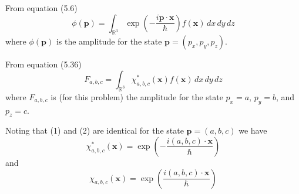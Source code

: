 


From equation (5.6)
\begin{equation*}
\phi(\mathbf p)=\int_{\mathbb R^3}\exp\left(-\frac{i\mathbf p\cdot\mathbf x}{\hbar}\right)f(\mathbf x)\,dx\,dy\,dz
\tag{1}
\end{equation*}
where $\phi(\mathbf p)$ is the amplitude for the state $\mathbf p=(p_x,p_y,p_z)$.

\bigskip
From equation (5.36)
\begin{equation*}
F_{a,b,c}=\int_{\mathbb R^3}\chi_{a,b,c}^*(\mathbf x)f(\mathbf x)\,dx\,dy\,dz
\tag{2}
\end{equation*}
where $F_{a,b,c}$ is (for this problem) the amplitude for the state $p_x=a$, $p_y=b$, and $p_z=c$.

\bigskip
Noting that (1) and (2) are identical for the state $\mathbf p=(a,b,c)$ we have
\begin{equation*}
\chi_{a,b,c}^*(\mathbf x)=\exp\left(-\frac{i(a,b,c)\cdot\mathbf x}{\hbar}\right)
\end{equation*}
and
\begin{equation*}
\chi_{a,b,c}(\mathbf x)=\exp\left(\frac{i(a,b,c)\cdot\mathbf x}{\hbar}\right)
\end{equation*}


